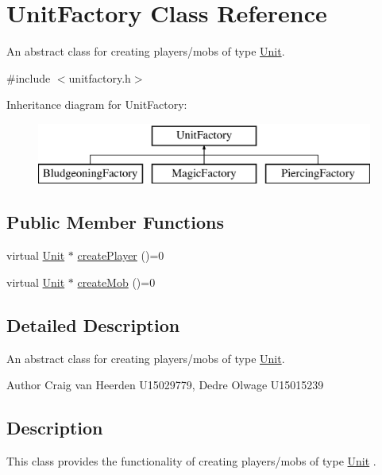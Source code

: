 \hypertarget{class_unit_factory}{\section{\-Unit\-Factory \-Class \-Reference}
\label{class_unit_factory}
}


\-An abstract class for creating players/mobs of type \hyperlink{class_unit}{\-Unit}.  




{\ttfamily \#include $<$unitfactory.\-h$>$}

\-Inheritance diagram for \-Unit\-Factory\-:\begin{figure}[H]
\begin{center}
\leavevmode
\includegraphics[height=2.000000cm]{class_unit_factory}
\end{center}
\end{figure}
\subsection*{\-Public \-Member \-Functions}
\begin{DoxyCompactItemize}
\item 
virtual \hyperlink{class_unit}{\-Unit} $\ast$ \hyperlink{class_unit_factory_ad0c4ed547dcb38f6176a660850d405c6}{create\-Player} ()=0
\item 
virtual \hyperlink{class_unit}{\-Unit} $\ast$ \hyperlink{class_unit_factory_a4e24da648ac60377695a698b75be3d7a}{create\-Mob} ()=0
\end{DoxyCompactItemize}


\subsection{\-Detailed \-Description}
\-An abstract class for creating players/mobs of type \hyperlink{class_unit}{\-Unit}. 

\begin{DoxyAuthor}{\-Author}
\-Craig van \-Heerden \-U15029779, \-Dedre \-Olwage \-U15015239
\end{DoxyAuthor}
\hypertarget{class_unit_factory_Description}{}\subsection{\-Description}\label{class_unit_factory_Description}
\-This class provides the functionality of creating players/mobs of type \hyperlink{class_unit}{\-Unit} . 

